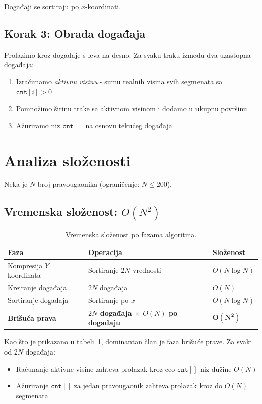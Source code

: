 \documentclass{article}
\begin{document}
Događaji se sortiraju po $x$-koordinati.

\subsection{Korak 3: Obrada događaja}

Prolazimo kroz događaje s leva na desno. Za svaku traku između dva uzastopna događaja:

\begin{enumerate}[nosep]
    \item Izračunamo \textit{aktivnu visinu} - sumu realnih visina svih segmenata sa $\texttt{cnt}[i] > 0$
    \item Pomnožimo širinu trake sa aktivnom visinom i dodamo u ukupnu površinu
    \item Ažuriramo niz $\texttt{cnt}[]$ na osnovu tekućeg događaja
\end{enumerate}

\section{Analiza složenosti}

Neka je $N$ broj pravougaonika (ograničenje: $N \leq 200$).

\subsection{Vremenska složenost: $O(N^2)$}

\begin{table}[H]
\centering
\begin{tabular}{lll}
\toprule
Faza & Operacija & Složenost \\
\midrule
Kompresija $Y$ koordinata & Sortiranje $2N$ vrednosti & $O(N \log N)$ \\
Kreiranje događaja & $2N$ događaja & $O(N)$ \\
Sortiranje događaja & Sortiranje po $x$ & $O(N \log N)$ \\
\textbf{Brišuća prava} & \textbf{$2N$ događaja $\times$ $O(N)$ po događaju} & $\boldsymbol{O(N^2)}$ \\
\bottomrule
\end{tabular}
\caption{Vremenska složenost po fazama algoritma.}
\label{tab:complexity}
\end{table}

Kao što je prikazano u tabeli~\ref{tab:complexity}, dominantan član je faza brišuće prave. Za svaki od $2N$ događaja:
\begin{itemize}[nosep]
    \item Računanje aktivne visine zahteva prolazak kroz ceo $\texttt{cnt}[]$ niz dužine $O(N)$
    \item Ažuriranje $\texttt{cnt}[]$ za jedan pravougaonik zahteva prolazak kroz do $O(N)$ segmenata
\end{itemize}
\end{document}
